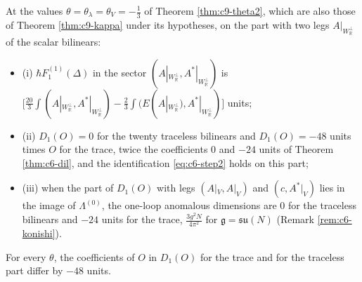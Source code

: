 \begin{corollary}
\label{cor:c9-ident}
At the values $\theta=\theta_\lambda=\theta_V=-\tfrac13$ of Theorem \ref{thm:c9-theta2}, which are also those of Theorem \ref{thm:c9-kappa} under its hypotheses, on the part with two legs $A|_{W_{\mathbb R}^\perp}$ of the scalar bilinears:
\begin{itemize}
\item (i) $\hbar F_1^{(1)}(\Delta)$ in the sector $(A|_{W_{\mathbb R}^\perp},A^*|_{W_{\mathbb R}^\perp})$ is $\big[\tfrac{20}3\int(A|_{W_{\mathbb R}^\perp},A^*|_{W_{\mathbb R}^\perp})-\tfrac23\int(E(A|_{W_{\mathbb R}^\perp}),A^*|_{W_{\mathbb R}^\perp})\big]$ units;
\item (ii) $D_1(O)=0$ for the twenty traceless bilinears and $D_1(O)=-48$ units times $O$ for the trace, twice the coefficients $0$ and $-24$ units of Theorem \ref{thm:c6-dil}, and the identification \eqref{eq:c6-step2} holds on this part;
\item (iii) when the part of $D_1(O)$ with legs $(A|_V,A|_V)$ and $(c,A^*|_V)$ lies in the image of $\Lambda^{(0)}$, the one-loop anomalous dimensions are $0$ for the traceless bilinears and $-24$ units for the trace, $\tfrac{3g^2N}{4\pi^2}$ for $\mathfrak g=\mathfrak{su}(N)$ (Remark \ref{rem:c6-konishi}).
\end{itemize}
For every $\theta$, the coefficients of $O$ in $D_1(O)$ for the trace and for the traceless part differ by $-48$ units.
\end{corollary}
